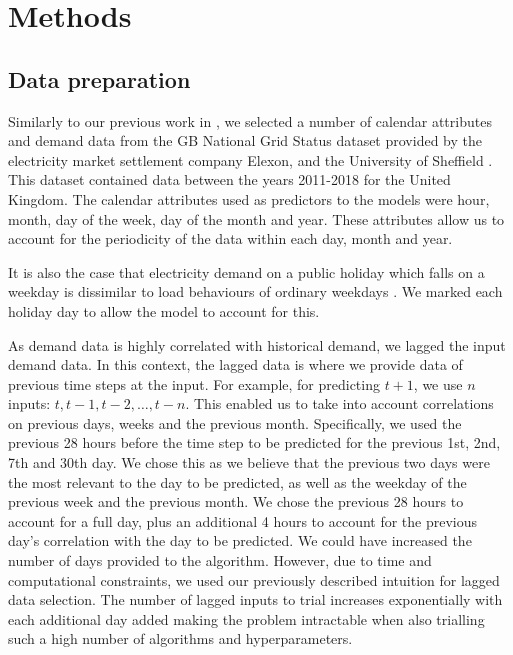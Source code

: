 \documentclass[final,3p,times,twocolumn,numbers]{elsarticle}
\begin{document}
\section{Methods}
\label{sec:methods}


\subsection{Data preparation}

Similarly to our previous work in \cite{Kell2018a}, we selected a number of calendar attributes and demand data from the GB National Grid Status dataset provided by the electricity market settlement company Elexon, and the University of Sheffield \cite{gbnationalgridstatus_2019}. This dataset contained data between the years 2011-2018 for the United Kingdom. The calendar attributes used as predictors to the models were hour, month, day of the week, day of the month and year. These attributes allow us to account for the periodicity of the data within each day, month and year.

It is also the case that electricity demand on a public holiday which falls on a weekday is dissimilar to load behaviours of ordinary weekdays \cite{Kim2000}. We marked each holiday day to allow the model to account for this.

As demand data is highly correlated with historical demand, we lagged the input demand data. In this context, the lagged data is where we provide data of previous time steps at the input. For example, for predicting $t+1$, we use $n$ inputs: $t,t-1,t-2,\ldots,t-n$. This enabled us to take into account correlations on previous days, weeks and the previous month. Specifically, we used the previous 28 hours before the time step to be predicted for the previous 1st, 2nd, 7th and 30th day. We chose this as we believe that the previous two days were the most relevant to the day to be predicted, as well as the weekday of the previous week and the previous month. We chose the previous 28 hours to account for a full day, plus an additional 4 hours to account for the previous day's correlation with the day to be predicted. We could have increased the number of days provided to the algorithm. However, due to time and computational constraints, we used our previously described intuition for lagged data selection. The number of lagged inputs to trial increases exponentially with each additional day added making the problem intractable when also trialling such a high number of algorithms and hyperparameters. 
\end{document}

